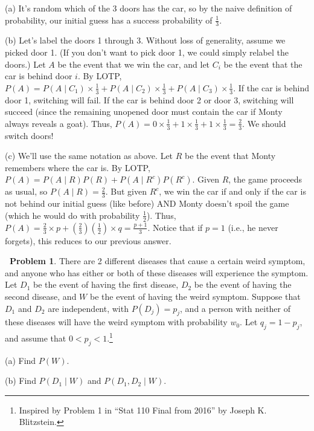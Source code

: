 \documentclass[12pt,oneside]{article}
\theoremstyle{definition}
\newtheorem{problem}{\faPen \ Problem}
\theoremstyle{remark}
\begin{document}
\begin{solutionbox}
(a) It's random which of the 3 doors has the car, so by the naive definition of probability, our initial guess has a success probability of $\frac{1}{3}$.

(b) Let's label the doors 1 through 3. Without loss of generality, assume we picked door 1. (If you don't want to pick door 1, we could simply relabel the doors.) Let $A$ be the event that we win the car, and let $C_i$ be the event that the car is behind door $i$. By LOTP, $P(A) = P(A \mid C_1) \times \frac{1}{3} + P(A \mid C_2) \times \frac{1}{3} + P(A \mid C_3) \times \frac{1}{3}$. If the car is behind door 1, switching will fail. If the car is behind door 2 or door 3, switching will succeed (since the remaining unopened door must contain the car if Monty always reveals a goat). Thus, $P(A) = 0 \times \frac{1}{3} + 1 \times \frac{1}{3} + 1 \times \frac{1}{3} = \frac{2}{3}$. We should switch doors!

(c) We'll use the same notation as above. Let $R$ be the event that Monty remembers where the car is. By LOTP, $P(A) = P(A \mid R) P(R) + P(A \mid R^c) P(R^c)$. Given $R$, the game proceeds as usual, so $P(A \mid R) = \frac{2}{3}$. But given $R^c$, we win the car if and only if the car is not behind our initial guess (like before) AND Monty doesn't spoil the game (which he would do with probability $\frac{1}{2}$). Thus, $P(A) = \frac{2}{3} \times p + \left( \frac{2}{3} \right) \left( \frac{1}{2} \right) \times q = \frac{p + 1}{3}$. Notice that if $p = 1$ (i.e., he never forgets), this reduces to our previous answer.
\end{solutionbox}

\begin{problem}
There are 2 different diseases that cause a certain weird symptom, and anyone who has either or both of these diseases will experience the symptom. Let $D_1$ be the event of having the first disease, $D_2$ be the event of having the second disease, and $W$ be the event of having the weird symptom. Suppose that $D_1$ and $D_2$ are independent, with $P(D_j) = p_j$, and a person with neither of these diseases will have the weird symptom with probability $w_0$. Let $q_j = 1 - p_j$, and assume that $0 < p_j < 1$.\footnote{Inspired by Problem 1 in \enquote{Stat 110 Final from 2016} by Joseph K. Blitzstein.}

(a) Find $P(W)$.

(b) Find $P(D_1 \mid W)$ and $P(D_1, D_2 \mid W)$.
\end{problem}
\end{document}

